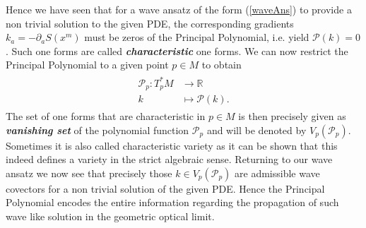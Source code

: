 \documentclass[a4paper,12pt, DIV=14, BCOR=5mm, twoside, headsepline, numbers=noenddot]{scrbook}
\begin{document}
Hence we have seen that for a wave ansatz of the form (\ref{waveAns}) to provide a non trivial solution to the given PDE, the corresponding gradients $k_a = - \partial_aS(x^m)$ must be zeros of the Principal Polynomial, i.e. yield $\mathcal{P}(k) = 0$.
Such one forms are called \textit{\textbf{characteristic}} one forms. We can now restrict the Principal Polynomial to a given point $p \in M$ to obtain 
\begin{align}
    \begin{aligned}
    \mathcal{P}_p : T^{\ast}_pM &\longrightarrow \mathbb{R}\\
    k &\longmapsto \mathcal{P}(k).
    \end{aligned}
\end{align}
The set of one forms that are characteristic in $p \in M$ is then precisely given as \textbf{\textit{vanishing set}} of the polynomial function $\mathcal{P}_p$ and will be denoted by $V_p(\mathcal{P}_p)$. Sometimes it is also called characteristic variety as it can be shown that this indeed defines a variety in the strict algebraic sense. Returning to our wave ansatz we now see that precisely those $k \in V_p(\mathcal{P}_p)$ are admissible wave covectors for a non trivial solution of the given PDE. Hence the Principal Polynomial encodes the entire information regarding the propagation of such wave like solution in the geometric optical limit.\\ 
\end{document}
